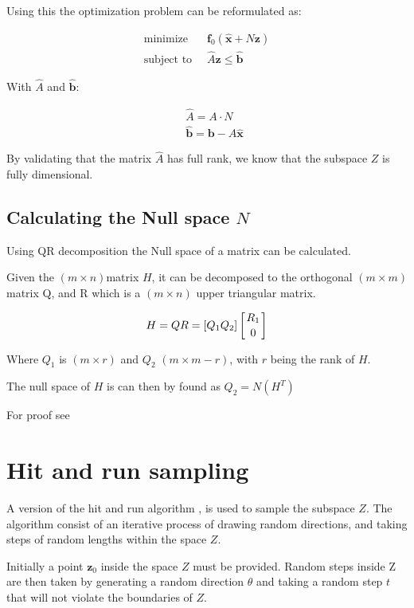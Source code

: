 \documentclass[11pt,a4paper,english]{article}
\begin{document}
Using this the optimization problem can be reformulated as:

\begin{align}
	\text{minimize} \;&\; \mathbf{f}_0(\mathbf{\hat{x}} + N \mathbf{z})  \\
	\text{subject to} \; &\; \hat{A}\mathbf{z} \leq \mathbf{\hat{b}} \label{eq:sub_problem}
\end{align}

With $\hat{A}$ and $ \mathbf{\hat{b}}$:

\begin{align}
	\;            &\;  \hat{A} = A \cdot N \\ 
	\;			& \; \mathbf{\hat{b}} = \mathbf{b}- A\mathbf{\hat{x}}
\end{align}

By validating that the matrix $\hat{A}$ has full rank, we know that the subspace $Z$ is fully dimensional. 

\subsection{Calculating the Null space $N$}

Using QR decomposition the Null space of a matrix can be calculated. 

Given the $(m \times n)$matrix $H$, it can be decomposed to the orthogonal $(m\times m)$ matrix Q, and R which is a $(m \times n)$ upper triangular matrix. 

\begin{equation}
	H = QR = \left[Q_1  Q_2 \right] \left[{R_1 \atop 0} \right]
\end{equation}

Where $Q_1$ is $(m \times r )$ and $Q_2$ $(m\times m-r)$, with $r$ being the rank of $H$. 

The null space of $H$ is can then by found as $Q_2 = N(H^T)$

For proof see \cite{Hyde}
\section{Hit and run sampling}

A version of the hit and run algorithm \cite{Smith1984}, is used to sample the subspace $Z$. The algorithm consist of an iterative process of drawing random directions, and taking steps of random lengths within the space $Z$. 

Initially a point $\mathbf{z}_0$ inside the space $Z$ must be provided. Random steps inside Z are then taken by generating a random direction $\theta$ and taking a random step $t$ that will not violate the boundaries of $Z$. 
\end{document}
